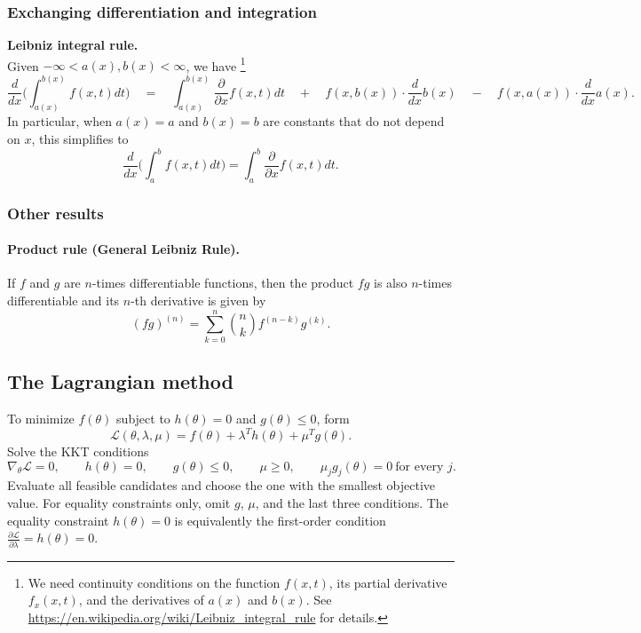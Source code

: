 \documentclass{article}
\newenvironment{mybox}{%
  \par\addvspace{10pt}%
  \begin{mdframed}[skipabove=0pt,skipbelow=10pt]%
}{%
  \end{mdframed}%
}
\theoremstyle{break}
\begin{document}
\subsubsection{Exchanging differentiation and integration}

\begin{mybox}
\textbf{Leibniz integral rule.}\\
Given $-\infty < a(x), b(x) < \infty$, we have
\footnote{We need continuity conditions on the function $f(x,t)$, its partial derivative $f_x(x,t)$, and the derivatives of $a(x)$ and $b(x)$. See \url{https://en.wikipedia.org/wiki/Leibniz_integral_rule} for details.}
\[
\frac{d}{dx}\Big(
    \int_{a(x)}^{b(x)} f(x, t) dt
\Big)
\quad=\quad
\int_{a(x)}^{b(x)} \frac{\partial}{\partial x} f(x,t) dt\quad +\quad f(x, b(x)) \cdot \frac{d}{dx}b(x)\quad -\quad f(x, a(x)) \cdot \frac{d}{dx} a(x).
\]
In particular, when $a(x) = a$ and $b(x)=b$ are constants that do not depend on $x$, this simplifies to
\[
\frac{d}{dx} \Big(\int_a^b f(x,t) dt\Big) = \int_a^b \frac{\partial}{\partial x} f(x,t) dt.
\]
\end{mybox}

\subsubsection{Other results}
\paragraph{Product rule (General Leibniz Rule).}\hfill\break
If $f$ and $g$ are $n$-times differentiable functions, then the product $fg$ is also $n$-times differentiable and its $n$-th derivative is given by
\[
(fg)^{(n)} = \sum_{k=0}^n \binom{n}{k} f^{(n-k)} g^{(k)}.
\]



\subsection{The Lagrangian method}\label{sec:misc-lagrangian}

To minimize $f(\theta)$ subject to $h(\theta)=0$ and $g(\theta)\leq 0$, form
\[
    \mathcal{L}(\theta,\lambda,\mu)
    =f(\theta)+\lambda^T h(\theta)+\mu^T g(\theta).
\]
Solve the KKT conditions
\[
    \nabla_\theta\mathcal{L}=0,\qquad
    h(\theta)=0,\qquad
    g(\theta)\leq0,\qquad
    \mu\geq0,\qquad
    \mu_jg_j(\theta)=0\ \text{for every }j.
\]
Evaluate all feasible candidates and choose the one with the smallest objective value. For equality constraints only, omit $g$, $\mu$, and the last three conditions.
The equality constraint $h(\theta)=0$ is equivalently the first-order condition $\frac{\partial\mathcal L}{\partial\lambda}=h(\theta)=0$.
\end{document}
